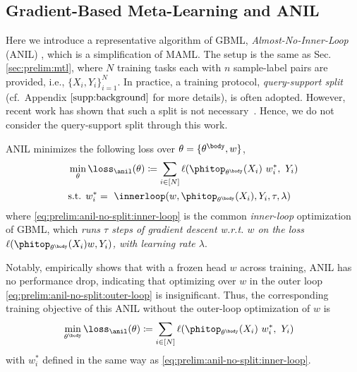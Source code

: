 \documentclass{article}
\begin{document}
\subsection{Gradient-Based Meta-Learning and ANIL}
\label{sec:prelim:gbml}
Here we introduce a representative algorithm of GBML, \textit{Almost-No-Inner-Loop} (ANIL) \cite{raghu2019rapid}, which is a simplification of MAML. The setup is the same as Sec. \ref{sec:prelim:mtl}, where $N$ {training tasks} each with $n$ sample-label pairs are provided, i.e., $\{X_i,Y_i\}_{i=1}^N$. In practice, a training protocol, \textit{query-support split} (cf.\ Appendix $\ref{supp:background}$ for more details), is often adopted. However, recent work has shown that such a split is not necessary~\cite{bai2021how}. Hence, we do not consider the query-support split through this work.

ANIL minimizes the following loss over $\theta=\{\theta^\body,w\}$,
\begin{align}
    &\min_\theta \loss_\anil(\theta) \coloneqq \sum_{i\in[N]} \ell(\phitop_{\theta^\body}(X_i) ~ w_i^*, ~Y_i) \label{eq:prelim:anil-no-split:outer-loop}\\
    &\text{s.t. }w_i^*=~\innerloop(w, \phitop_{\theta^\body}(X_i), Y_i, \tau,\lambda)\label{eq:prelim:anil-no-split:inner-loop}
\end{align} 
where \eqref{eq:prelim:anil-no-split:inner-loop} is the common \textit{inner-loop} optimization of GBML, which \textit{runs $\tau$ steps of gradient descent w.r.t. $w$ on the loss $\ell(\phitop_{\theta^\body}(X_i) w, Y_i)$, with learning rate $\lambda$}. 

Notably, \citet{lin2021to} empirically shows that with a frozen head $w$ across training, ANIL has no performance drop, indicating that optimizing over $w$ in the outer loop \eqref{eq:prelim:anil-no-split:outer-loop} is insignificant. Thus, the corresponding training objective of this  ANIL without the outer-loop optimization of $w$ is
\begin{align}
    &\min_{\theta^\body} \loss_\anil(\theta) \coloneqq \sum_{i\in[N]} \ell(\phitop_{\theta^\body}(X_i) ~ w_i^*, ~Y_i) \label{eq:prelim:anil-frozen-head:outer-loop}
\end{align}
with $w_i^*$ defined in the same way as \eqref{eq:prelim:anil-no-split:inner-loop}.

\vspace{-0.5em}
\end{document}
